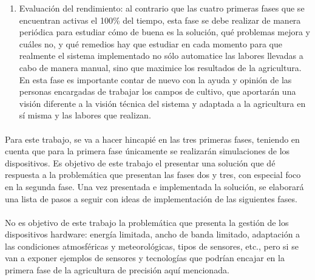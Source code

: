 \documentclass[../../memoria.tex]{subfiles}
\begin{document}
\begin{enumerate}
  \item  Evaluación del rendimiento: al contrario que las cuatro primeras fases que se encuentran activas el 100\% del tiempo, esta fase se debe realizar de manera periódica para estudiar cómo de buena es la solución, qué problemas mejora y cuáles no, y qué remedios hay que estudiar en cada momento para que realmente el sistema implementado no sólo automatice las labores llevadas a cabo de manera manual, sino que maximice los resultados de la agricultura. En esta fase es importante contar de nuevo con la ayuda y opinión de las personas encargadas de trabajar los campos de cultivo, que aportarán una visión diferente a la visión técnica del sistema y adaptada a la agricultura en sí misma y las labores que realizan.
\end{enumerate}

\paragraph{}
Para este trabajo, se va a hacer hincapié en las tres primeras fases, teniendo en cuenta que para la primera fase únicamente se realizarán simulaciones de los dispositivos. Es objetivo de este trabajo el presentar una solución que dé respuesta a la problemática que presentan las fases dos y tres, con especial foco en la segunda fase. Una vez presentada e implementada la solución, se elaborará una lista de pasos a seguir con ideas de implementación de las siguientes fases.

\paragraph{}
No es objetivo de este trabajo la problemática que presenta la gestión de los dispositivos hardware: energía limitada, ancho de banda limitado, adaptación a las condiciones atmosféricas y meteorológicas, tipos de sensores, etc., pero si se van a exponer ejemplos de sensores y tecnologías que podrían encajar en la primera fase de la agricultura de precisión aquí mencionada.
\end{document}
